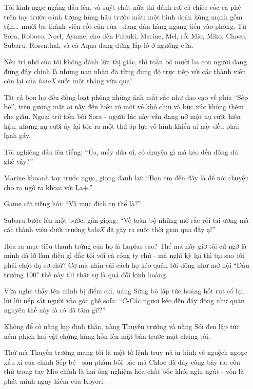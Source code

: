 \documentclass[../main.tex]{subfiles}
\begin{document}
Tôi kinh ngạc ngẩng đầu lên, và suýt chút nữa thì đánh rơi cả chiếc cốc cà phê trên tay trước cảnh tượng hùng hậu trước mắt: một binh đoàn hùng mạnh gồm tận\dots\ mười ba thành viên cốt cán của \hll\ đang dàn hàng ngang tiến vào phòng. Từ Sora, Roboco, Noel, Ayame, cho đến Fubuki, Marine, Mel, rồi Mio, Miko, Choco, Subaru, Rosenthal, và cả Aqua đang đứng lấp ló ở ngưỡng cửa.


Nếu trí nhớ của tôi không đánh lừa thị giác, thì toàn bộ mười ba con người đang đứng đây chính là những nạn nhân đã từng đụng độ trực tiếp với các thành viên còn lại của \textit{holoX} suốt một tháng vừa qua!

Tất cả bọn họ đều đồng loạt phóng những ánh mắt sắc như dao cạo về phía ``Sếp bé'', trên gương mặt ai nấy đều hiện rõ một vẻ khó chịu và bức xúc không thèm che giấu. Ngoại trừ tiền bối Sora - người lúc này vẫn đang nở một nụ cười hiền hậu, nhưng nụ cười ấy lại tỏa ra một thứ áp lực vô hình khiến ai nấy đều phải lạnh gáy.

Tôi nghiêng đầu lên tiếng: ``Ủa, mấy đứa ơi, có chuyện gì mà kéo đến đông đủ ghê vậy?''

Marine khoanh tay trước ngực, giọng đanh lại: ``Bọn em đến đây là để nói chuyện cho ra ngô ra khoai với La+.''

Game cất tiếng hỏi: ``Và mục đích cụ thể là?''

Subaru bước lên một bước, gằn giọng: ``Về toàn bộ những mớ rắc rối tai ương mà các thành viên dưới trướng \textit{holoX} đã gây ra suốt thời gian qua đấy ạ!''

Hóa ra mục tiêu thanh trừng của họ là Laplus sao? Thế mà nãy giờ tôi cứ ngỡ là mình đã lỡ làm điều gì đắc tội với cả công ty chứ - mà nghĩ kỹ lại thì tại sao tôi phải chột dạ cơ chứ? Cơ mà nhìn cái cách họ kéo quân tới đông như mở hội ``Đấu trường 100'' thế này thì thật sự là quá đỗi kinh hoàng.

Vừa nghe thấy tên mình bị điểm chỉ, nàng Sừng bò lập tức hoảng hốt rụt cổ lại, lùi lũi nép sát người vào góc ghế sofa: ``C-Các ngươi kéo đến đây đông như quân nguyên thế này là có dã tâm gì!?''

Không để cô nàng kịp định thần, nàng Thuyền trưởng và nàng Sói đen lập tức ném phịch hai vật chứng hùng hồn lên mặt bàn trước mặt chúng tôi.

Thứ mà Thuyền trưởng mang tới là một tờ lệnh truy nã in hình vẽ nguệch ngoạc xấu xí của chính Sếp bé - sản phẩm bôi bác mà Chloe đã dày công bày ra; còn thứ trong tay Mio chính là hai ống nghiệm hóa chất bốc khói nghi ngút - vốn là phát minh nguy hiểm của Koyori.
\end{document}
